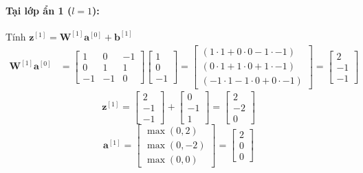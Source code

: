 \paragraph{Tại lớp ẩn 1 ($l=1$):\\}
Tính $\mathbf{z}^{[1]} = \mathbf{W}^{[1]}\mathbf{a}^{[0]} + \mathbf{b}^{[1]}$
\begin{align*}
\mathbf{W}^{[1]}\mathbf{a}^{[0]} 
&= 
\begin{bmatrix}
    1 & 0 & -1 \\
    0 & 1 & 1 \\
    -1 & -1 & 0
\end{bmatrix}
\begin{bmatrix}
    1 \\ 0 \\ -1
\end{bmatrix}
=
\begin{bmatrix}
    (1\cdot 1 + 0\cdot 0 - 1\cdot -1) \\
    (0\cdot 1 + 1\cdot 0 + 1\cdot -1) \\
    (-1\cdot 1 - 1\cdot 0 + 0\cdot -1)
\end{bmatrix}
=
\begin{bmatrix}
    2 \\ -1 \\ -1
\end{bmatrix}
\end{align*}
\begin{equation}
\mathbf{z}^{[1]} = 
\begin{bmatrix}
    2 \\ -1 \\ -1
\end{bmatrix}
+
\begin{bmatrix}
    0 \\ -1 \\ 1
\end{bmatrix}
=
\begin{bmatrix}
    2 \\ -2 \\ 0
\end{bmatrix}
\end{equation}
\begin{equation}
\mathbf{a}^{[1]} = 
\begin{bmatrix}
    \max(0, 2) \\
    \max(0, -2) \\
    \max(0, 0)
\end{bmatrix}
=
\begin{bmatrix}
    2 \\ 0 \\ 0
\end{bmatrix}
\end{equation}

